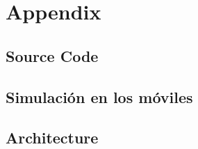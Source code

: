 \chapter{Appendix}

\section{Source Code}

\section{Simulación en los móviles}

\section{Architecture}
